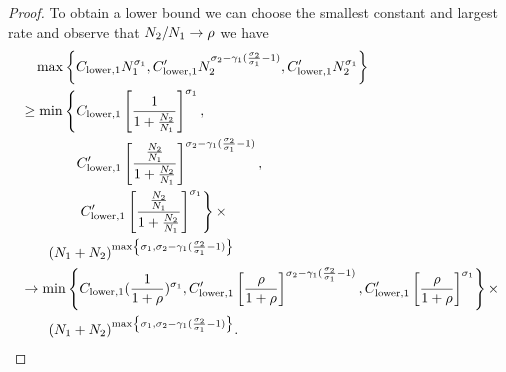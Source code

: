 \begin{proof}
To obtain a lower bound we can choose the smallest constant and largest rate and observe that $N_{2}/N_{1}\to \rho$ we have
\begin{align*}
    &~~~\max\left\{C_{\mathrm{lower},1}N_{1}^{\sigma_{1}}, C_{\mathrm{lower},1}'N_{2}^{\sigma_{2}-\gamma_{1}(\frac{\sigma_{2}}{\sigma_{1}}-1)}, C_{\mathrm{lower},1}'N_{2}^{\sigma_{1}}\right\}\\
    &\ge \min\left\{C_{\mathrm{lower},1}\left[\frac{1}{1+\frac{N_{2}}{N_{1}}}\right]^{\sigma_{1}}, \right. \\
    & \qquad\qquad C_{\mathrm{lower},1}'\left[\frac{\frac{N_{2}}{N_{1}}}{1+\frac{N_{2}}{N_{1}}}\right]^{\sigma_{2}-\gamma_{1}(\frac{\sigma_{2}}{\sigma_{1}}-1)}, \\
    &\left. \qquad \qquad C_{\mathrm{lower},1}'\left[\frac{\frac{N_{2}}{N_{1}}}{1+\frac{N_{2}}{N_{1}}}\right]^{\sigma_{1}}\right\} \times \\
    &~~~~~~(N_{1}+N_{2})^{\max\left\{\sigma_{1}, \sigma_{2}-\gamma_{1}(\frac{\sigma_{2}}{\sigma_{1}}-1) \right\}}\\
    &\to \min\left\{C_{\mathrm{lower},1}(\frac{1}{1+\rho})^{\sigma_{1}}, 
    C_{\mathrm{lower},1}'\left[\frac{\rho}{1+\rho}\right]^{\sigma_{2}-\gamma_{1}(\frac{\sigma_{2}}{\sigma_{1}}-1)}, 
    C_{\mathrm{lower},1}'\left[\frac{\rho}{1+\rho}\right]^{\sigma_{1}}\right\} \times \\
    &~~~~~~(N_{1}+N_{2})^{\max\left\{\sigma_{1}, \sigma_{2}-\gamma_{1}(\frac{\sigma_{2}}{\sigma_{1}}-1) \right\}}.
\end{align*}


\end{proof}
